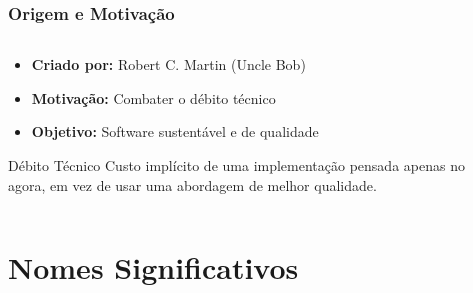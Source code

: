 \documentclass[aspectratio=169]{beamer}
\begin{document}
\begin{frame}
\frametitle{Origem e Motivação}
\begin{columns}
\begin{column}{0.6\textwidth}
\footnotesize
\begin{itemize}
    \item \textbf{Criado por:} Robert C. Martin (Uncle Bob)
    \item \textbf{Motivação:} Combater o débito técnico
    \item \textbf{Objetivo:} Software sustentável e de qualidade
\end{itemize}

\vspace{0.3cm}
\begin{block}{Débito Técnico}
\scriptsize
Custo implícito de uma implementação pensada apenas no agora, em vez de usar uma abordagem de melhor qualidade.
\end{block}
\end{column}

\begin{column}{0.4\textwidth}
\begin{center}
\end{center}
\end{column}
\end{columns}
\end{frame}

\section{Nomes Significativos}
\end{document}
